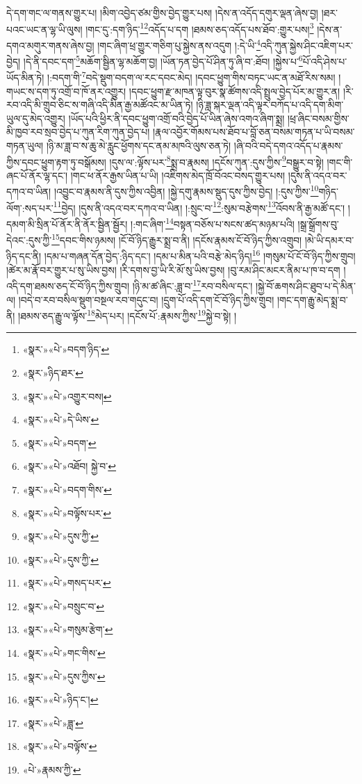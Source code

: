 དེ་དག་གང་ལ་གནས་གྱུར་པ། །མིག་འབྱེད་ཙམ་གྱིས་བྱེད་གྱུར་པས། །དེས་ན་འདོད་དགུར་ལྡན་ཞེས་བྱ། །ཐར་པའང་ཡང་ན་ལྷ་ཡི་ལུས། །གང་དུ་:དག་ཉིད་\footnote{«སྣར་»«པེ་»བདག་ཉིད་}\footnote{«སྣར་»ཉིད་ཐར་}འདོད་པ་དག །ཐམས་ཅད་འདོད་པས་ཐོབ་:གྱུར་པས།\footnote{«སྣར་»«པེ་»འགྱུར་བས།} །དེས་ན་དགའ་མགུར་གནས་ཞེས་བྱ། །གང་ཞིག་ཕྲ་གྱུར་གཅིག་པུ་སྐྱེས་ནས་འདུག །:དེ་ཡི་\footnote{«སྣར་»«པེ་»དེ་ཡིས་}འདི་ཀུན་སྐྱེས་ཤིང་འཇིག་པར་བྱེད། །དེ་ནི་དབང་དག་\footnote{«སྣར་»«པེ་»བདག་}མཆོག་སྦྱིན་ལྷ་མཆོག་བྱ། །ཡོན་ཏན་བྱེད་པོ་ཤིན་ཏུ་ཞི་བ་:ཐོབ། །སྐྱེས་པ་\footnote{«སྣར་»«པེ་»འཐོབ། སྐྱེ་བ་}པོ་འདི་ཤེས་པ་ཡོད་མིན་ཏེ། །:བདག་གི་\footnote{«སྣར་»«པེ་»བདག་གིས་}བདེ་སྡུག་བདག་ལ་རང་དབང་མེད། །དབང་ཕྱུག་གིས་བཏང་ཡང་ན་མཐོ་རིས་སམ། །གཡང་ས་དག་ཏུ་འགྲོ་བ་ཁོ་ནར་འགྱུར། །དབང་ཕྱུག་རྫ་མཁན་ལྟ་བུར་སྣ་ཚོགས་འདི་སྤྲུལ་བྱེད་པོར་མ་གྱུར་ན། །རི་རབ་འདི་མི་གྲུབ་ཅིང་ས་གཞི་འདི་མིན་རྒྱ་མཚོའང་མ་ཡིན་ཏེ། །ཉི་ཟླ་སྐར་ལྡན་འདི་ལྟར་བཀོད་པ་འདི་དག་མིག་ཡུལ་དུ་མེད་འགྱུར། །ཡོད་པའི་ཕྱིར་ནི་དབང་ཕྱུག་འགྲོ་བའི་བྱེད་པོ་ཡིན་ཞེས་འགའ་ཞིག་སྨྲ། །ཕྲ་ཞིང་བསམ་གྱིས་མི་ཁྱབ་རབ་སྲབ་བྱེད་པ་ཀུན་རིག་ཀུན་བྱེད་པ། །རྣལ་འབྱོར་གོམས་པས་ཐོབ་པ་བློ་ཅན་བསམ་གཏན་པ་ཡི་བསམ་གཏན་ཡུལ། །ཉི་མ་ཟླ་བ་ས་ཆུ་མེ་རླུང་ཕྱོགས་དང་ནམ་མཁའི་ལུས་ཅན་ཏེ། །ཞི་བའི་བདེ་དགའ་འདོད་པ་རྣམས་ཀྱིས་དབང་ཕྱུག་རྟག་ཏུ་བསྒོམས། །དུས་ལ་:ལྟོས་པར་\footnote{«སྣར་»«པེ་»བལྟོས་པར་}སྨྲ་བ་རྣམས། །དངོས་ཀུན་:དུས་ཀྱིས་\footnote{«སྣར་»«པེ་»དུས་ཀྱི་}བསྒྱུར་བ་སྟེ། །གང་གི་ཞང་པོ་ནོར་ལྷ་དང་། །གང་ཕ་ནོར་རྒྱས་ཡིན་པ་ཡི། །འཇིགས་མེད་ཁྲོ་བོའང་བསད་གྱུར་པས། །དུས་ནི་འདའ་བར་དཀའ་བ་ཡིན། །འབྱུང་བ་རྣམས་ནི་དུས་ཀྱིས་འབྱིན། །སྐྱེ་དགུ་རྣམས་སྡུད་དུས་ཀྱིས་བྱེད། །:དུས་ཀྱིས་\footnote{«སྣར་»«པེ་»དུས་ཀྱི་}གཉིད་ལོག་:སད་པར་\footnote{«སྣར་»«པེ་»གསད་པར་}བྱེད། །དུས་ནི་འདའ་བར་དཀའ་བ་ཡིན། །:སྲུང་བ་\footnote{«སྣར་»«པེ་»བསྲུང་བ་}:སུམ་བརྩེགས་\footnote{«སྣར་»«པེ་»གསུམ་རྩེག་}འོབས་ནི་རྒྱ་མཚོ་དང་། །དམག་མི་སྲིན་པོ་ནོར་ནི་ནོར་སྦྱིན་སྦྱོར། །:གང་ཞིག་\footnote{«སྣར་»«པེ་»གང་གིས་}བསྟན་བཅོས་པ་སངས་ཚད་མཉམ་པའི། །སྒྲ་སྒྲོགས་བུ་དེའང་:དུས་ཀྱི་\footnote{«སྣར་»«པེ་»དུས་ཀྱིས་}དབང་གིས་ཉམས། །ངོ་བོ་ཉིད་རྒྱུར་སྨྲ་བ་ནི། །དངོས་རྣམས་ངོ་བོ་ཉིད་ཀྱིས་འགྲུབ། །མེ་ཡི་དམར་བ་ཉིད་དང་ནི། །དམ་པ་གཞན་དོན་བྱེད་:ཉིད་དང་། །དམ་པ་མིན་པའི་བརྩེ་མེད་ཉིད།\footnote{«སྣར་»«པེ་»ཉིད་ང་།} །གསུམ་པོ་ངོ་བོ་ཉིད་ཀྱིས་གྲུབ། །ཚེར་མ་རྣོ་བར་གྱུར་པ་སུ་ཡིས་བྱས། །རི་དགས་བྱ་ཡི་རི་མོ་སུ་ཡིས་བྱས། །བུ་རམ་ཤིང་མངར་ནིམ་པ་ཁ་བ་དག །འདི་དག་ཐམས་ཅད་ངོ་བོ་ཉིད་ཀྱིས་གྲུབ། །ཉི་མ་ཚ་ཞིང་:ཟླ་བ་\footnote{«སྣར་»«པེ་»ཟླ་}རབ་བསིལ་དང་། །སྐྱེ་བོ་ཆགས་ཤིང་ཐུབ་པ་དེ་མིན་ལ། །བདེ་བ་རབ་བསིལ་སྡུག་བསྔལ་རབ་གདུང་བ། །དྲུག་པོ་འདི་དག་ངོ་བོ་ཉིད་ཀྱིས་གྲུབ། །གང་དག་རྒྱུ་མེད་སྨྲ་བ་ནི། །ཐམས་ཅད་རྒྱུ་ལ་ལྟོས་\footnote{«སྣར་»«པེ་»བལྟོས་}མེད་པར། །དངོས་པོ་:རྣམས་ཀྱིས་\footnote{«པེ་»རྣམས་ཀྱི་}སྐྱེ་བ་སྟེ། །
